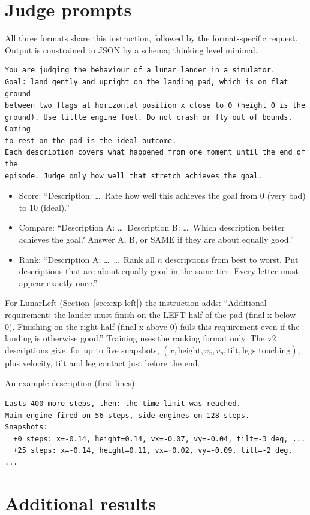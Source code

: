 \documentclass[11pt]{article}
\theoremstyle{remark}
\begin{document}
\section{Judge prompts}
\label{app:prompts}
All three formats share this instruction, followed by the format-specific request. Output is constrained to JSON by a schema; thinking level minimal.
\begin{verbatim}
You are judging the behaviour of a lunar lander in a simulator.
Goal: land gently and upright on the landing pad, which is on flat ground
between two flags at horizontal position x close to 0 (height 0 is the
ground). Use little engine fuel. Do not crash or fly out of bounds. Coming
to rest on the pad is the ideal outcome.
Each description covers what happened from one moment until the end of the
episode. Judge only how well that stretch achieves the goal.
\end{verbatim}
\begin{itemize}
\item Score: ``Description: \dots\ Rate how well this achieves the goal from 0 (very bad) to 10 (ideal).''
\item Compare: ``Description A: \dots\ Description B: \dots\ Which description better achieves the goal? Answer A, B, or SAME if they are about equally good.''
\item Rank: ``Description A: \dots\ \dots\ Rank all $n$ descriptions from best to worst. Put descriptions that are about equally good in the same tier. Every letter must appear exactly once.''
\end{itemize}
For LunarLeft (Section~\ref{sec:exp-left}) the instruction adds: ``Additional requirement: the lander must finish on the LEFT half of the pad (final x below 0). Finishing on the right half (final x above 0) fails this requirement even if the landing is otherwise good.'' Training uses the ranking format only. The v2 descriptions give, for up to five snapshots, $(x,\text{height},v_x,v_y,\text{tilt},\text{legs touching})$, plus velocity, tilt and leg contact just before the end.

An example description (first lines):
\begin{verbatim}
Lasts 400 more steps, then: the time limit was reached.
Main engine fired on 56 steps, side engines on 128 steps.
Snapshots:
  +0 steps: x=-0.14, height=0.14, vx=-0.07, vy=-0.04, tilt=-3 deg, ...
  +25 steps: x=-0.14, height=0.11, vx=+0.02, vy=-0.09, tilt=-2 deg, ...
\end{verbatim}

\section{Additional results}
\label{app:results}
\end{document}
